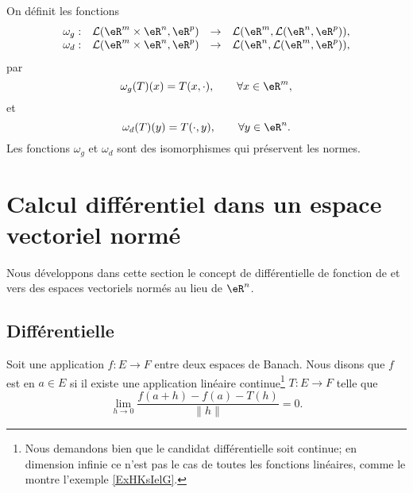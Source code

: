 \begin{proposition}\label{isom_isom}
  On définit les fonctions
  \begin{equation}
    \begin{array}{rccc}
      \omega_g: & \mathcal{L}(\eR^{m}\times\eR^{n}, \eR^p)&\to &\mathcal{L}(\eR^{m}, \mathcal{L}(\eR^{n}, \eR^p)),\\
      \omega_d: & \mathcal{L}(\eR^{m}\times\eR^{n}, \eR^p)&\to &\mathcal{L}(\eR^{n}, \mathcal{L}(\eR^{m}, \eR^p)),
    \end{array}
  \end{equation}
par 
\[
\omega_g(T)(x)=T(x,\cdot), \qquad \forall x\in\eR^m,
\]
et
\[
\omega_d(T)(y)=T(\cdot, y), \qquad \forall y\in\eR^n.
\]
Les fonctions $\omega_g$ et $\omega_d$ sont des isomorphismes qui préservent les normes.    
\end{proposition}

\section{Calcul différentiel dans un espace vectoriel normé}
\label{SecLStKEmc}

Nous développons dans cette section le concept de différentielle de fonction de et vers des espaces vectoriels normés au lieu de \( \eR^n\).

\subsection{Différentielle}

\begin{definition}  \label{DefKZXtcIT}
    Soit une application \( f\colon E\to F\) entre deux espaces de Banach. Nous disons que \( f\) est  en \( a\in E\) si il existe une application linéaire continue\footnote{Nous demandons bien que le candidat différentielle soit continue; en dimension infinie ce n'est pas le cas de toutes les fonctions linéaires, comme le montre l'exemple \ref{ExHKsIelG}.} \( T\colon E\to F\) telle que
    \begin{equation}\label{EqIQuRGmO}
        \lim_{h\to 0} \frac{ f(a+h)-f(a)-T(h) }{ \| h \| }=0.
    \end{equation}
\end{definition}

